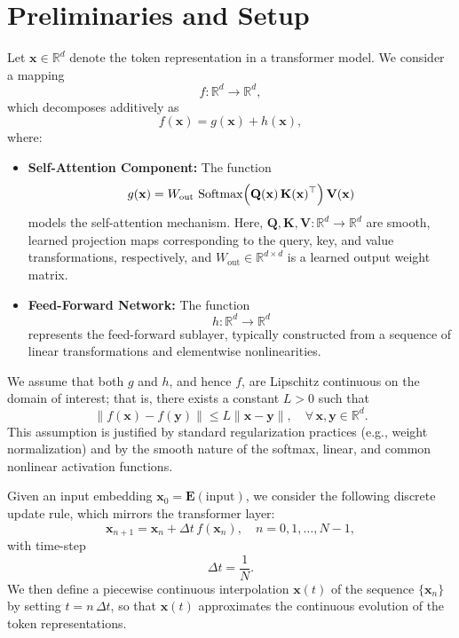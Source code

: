 
\section{Preliminaries and Setup}

Let $\mathbf{x} \in \mathbb{R}^d$ denote the token representation in a transformer model. We consider a mapping
\[
f: \mathbb{R}^d \to \mathbb{R}^d,
\]
which decomposes additively as
\[
f(\mathbf{x}) = g(\mathbf{x}) + h(\mathbf{x}),
\]
where:
\begin{itemize}
    \item \textbf{Self-Attention Component:} The function
    \[
    g(\mathbf{x}) = W_{\mathrm{out}}\, \operatorname{Softmax}\Bigl( \mathbf{Q}(\mathbf{x})\,\mathbf{K}(\mathbf{x})^\top \Bigr)\, \mathbf{V}(\mathbf{x})
    \]
    models the self-attention mechanism. Here, $\mathbf{Q},\mathbf{K},\mathbf{V}: \mathbb{R}^d \to \mathbb{R}^d$ are smooth, learned projection maps corresponding to the query, key, and value transformations, respectively, and $W_{\mathrm{out}} \in \mathbb{R}^{d \times d}$ is a learned output weight matrix.
    
    \item \textbf{Feed-Forward Network:} The function
    \[
    h: \mathbb{R}^d \to \mathbb{R}^d
    \]
    represents the feed-forward sublayer, typically constructed from a sequence of linear transformations and elementwise nonlinearities.
\end{itemize}

We assume that both $g$ and $h$, and hence $f$, are Lipschitz continuous on the domain of interest; that is, there exists a constant $L > 0$ such that
\[
\|f(\mathbf{x}) - f(\mathbf{y})\| \le L \|\mathbf{x} - \mathbf{y}\|, \quad \forall\, \mathbf{x}, \mathbf{y} \in \mathbb{R}^d.
\]
This assumption is justified by standard regularization practices (e.g., weight normalization) and by the smooth nature of the softmax, linear, and common nonlinear activation functions.

Given an input embedding $\mathbf{x}_0 = \mathbf{E}(\text{input})$, we consider the following discrete update rule, which mirrors the transformer layer:
\[
\mathbf{x}_{n+1} = \mathbf{x}_n + \Delta t\, f(\mathbf{x}_n), \quad n = 0,1,\dots, N-1,
\]
with time-step
\[
\Delta t = \frac{1}{N}.
\]
We then define a piecewise continuous interpolation $\mathbf{x}(t)$ of the sequence $\{\mathbf{x}_n\}$ by setting $t = n\,\Delta t$, so that $\mathbf{x}(t)$ approximates the continuous evolution of the token representations.

